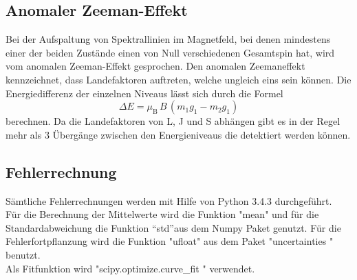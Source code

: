 \subsection{Anomaler Zeeman-Effekt}
Bei der Aufspaltung von Spektrallinien im Magnetfeld, bei denen mindestens einer der beiden Zustände einen von Null verschiedenen Gesamtspin hat, wird vom anomalen Zeeman-Effekt gesprochen. Den anomalen Zeemaneffekt kennzeichnet, dass Landefaktoren auftreten, welche ungleich eins sein können. Die Energiedifferenz der einzelnen Niveaus lässt sich durch die Formel
\begin{equation}
  \Delta E = \mu_\text{B}\,B\,(m_1 g_1 - m_2 g_1)
  \label{eqn:dE}
\end{equation}
berechnen. Da die Landefaktoren von L, J und S abhängen gibt es in der Regel mehr als 3 Übergänge zwischen den Energieniveaus die detektiert werden können.

\subsection{Fehlerrechnung}
Sämtliche Fehlerrechnungen werden mit Hilfe von Python 3.4.3 durchgeführt. \\
Für die Berechnung der Mittelwerte wird die Funktion "mean" und für die Standardabweichung die Funktion ``std''aus dem Numpy Paket genutzt. Für die Fehlerfortpflanzung wird die Funktion "ufloat" aus dem Paket "uncertainties \cite{uncertainties}" benutzt. \\
Als Fitfunktion wird "scipy.optimize.curve\_fit \cite{scipy}" verwendet.
